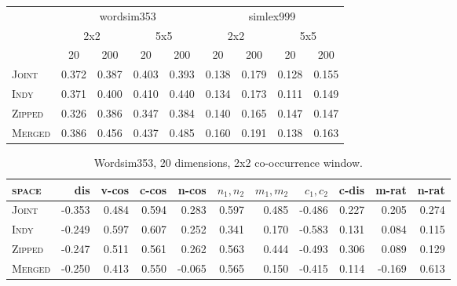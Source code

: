 \begin{table}
\begin{tabular}{lrrrr|rrrr}
\hline
& \multicolumn{4}{c|}{wordsim353} & \multicolumn{4}{c}{simlex999} \\
& \multicolumn{2}{c}{2x2} & \multicolumn{2}{c|}{5x5} & \multicolumn{2}{c}{2x2} & \multicolumn{2}{c}{5x5} \\
& \multicolumn{1}{c}{20} & \multicolumn{1}{c}{200} & \multicolumn{1}{c}{20} & \multicolumn{1}{c|}{200} & \multicolumn{1}{c}{20} & \multicolumn{1}{c}{200} & \multicolumn{1}{c}{20} & \multicolumn{1}{c}{200} \\
\hline
\textsc{Joint} & 0.372 & 0.387 & 0.403 & 0.393 & 0.138 & 0.179 & 0.128 & 0.155 \\
\textsc{Indy} & 0.371 & 0.400 & 0.410 & 0.440 & 0.134 & 0.173 & 0.111 & 0.149 \\
\textsc{Zipped} & 0.326 & 0.386 & 0.347 & 0.384 & 0.140 & 0.165 & 0.147 & 0.147 \\
\textsc{Merged} & 0.386 & 0.456 & 0.437 & 0.485 & 0.160 & 0.191 & 0.138 & 0.163 \\
\hline
\end{tabular}
\end{table}

\begin{table}
\begin{tabular}{lrrrrrrrrrr}
\hline
\textsc{space} & dis & v-cos & c-cos & n-cos & $n_1,n_2$ & $m_1,m_2$ & $c_1,c_2$ & c-dis & m-rat & n-rat \\
\hline
\textsc{Joint} & -0.353 & 0.484 & 0.594 & 0.283 & 0.597 & 0.485 & -0.486 & 0.227 & 0.205 & 0.274 \\
\textsc{Indy} & -0.249 & 0.597 & 0.607 & 0.252 & 0.341 & 0.170 & -0.583 & 0.131 & 0.084 & 0.115 \\
\textsc{Zipped} & -0.247 & 0.511 & 0.561 & 0.262 & 0.563 & 0.444 & -0.493 & 0.306 & 0.089 & 0.129 \\
\textsc{Merged} & -0.250 & 0.413 & 0.550 & -0.065 & 0.565 & 0.150 & -0.415 & 0.114 & -0.169 & 0.613 \\
\hline
\end{tabular}
\caption{Wordsim353, 20 dimensions, 2x2 co-occurrence window.}
\end{table}

